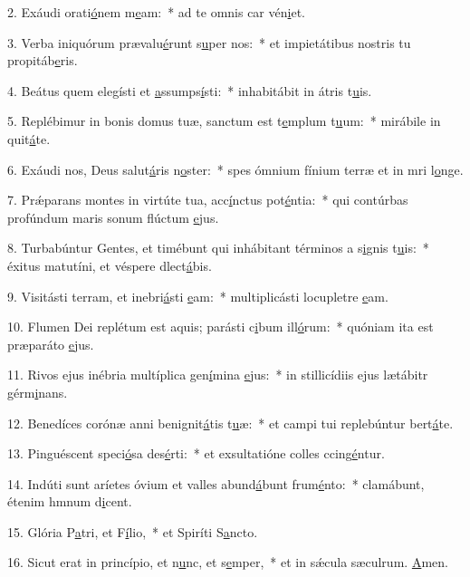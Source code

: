 2. Exáudi orati\uline{ó}nem m\uline{e}am:~* ad te omnis car vén\uline{i}et.\par 
3. Verba iniquórum prævalu\uline{é}runt s\uline{u}per nos:~* et impietátibus nostris tu propitáb\uline{e}ris.\par 
4. Beátus quem elegísti et \uline{a}ssumps\uline{í}sti:~* inhabitábit in átris t\uline{u}is.\par 
5. Replébimur in bonis domus tuæ, sanctum est t\uline{e}mplum t\uline{u}um:~* mirábile in quit\uline{á}te.\par 
6. Exáudi nos, Deus salut\uline{á}ris n\uline{o}ster:~* spes ómnium fínium terræ et in mri l\uline{o}nge.\par 
7. Prǽparans montes in virtúte tua, acc\uline{í}nctus pot\uline{é}ntia:~* qui contúrbas profúndum maris sonum flúctum \uline{e}jus.\par 
8. Turbabúntur Gentes, et timébunt qui inhábitant términos a s\uline{i}gnis t\uline{u}is:~* éxitus matutíni, et véspere dlect\uline{á}bis.\par 
9. Visitásti terram, et inebri\uline{á}sti \uline{e}am:~* multiplicásti locupletre \uline{e}am.\par 
10. Flumen Dei replétum est aquis; parásti c\uline{i}bum ill\uline{ó}rum:~* quóniam ita est præparáto \uline{e}jus.\par 
11. Rivos ejus inébria multíplica gen\uline{í}mina \uline{e}jus:~* in stillicídiis ejus lætábitr gérm\uline{i}nans.\par 
12. Benedíces corónæ anni benignit\uline{á}tis t\uline{u}æ:~* et campi tui replebúntur bert\uline{á}te.\par 
13. Pinguéscent speci\uline{ó}sa des\uline{é}rti:~* et exsultatióne colles ccing\uline{é}ntur.\par 
14. Indúti sunt aríetes óvium et valles abund\uline{á}bunt frum\uline{é}nto:~* clamábunt, étenim hmnum d\uline{i}cent.\par 
15. Glória P\uline{a}tri, et F\uline{í}lio,~* et Spiríti S\uline{a}ncto.\par 
16. Sicut erat in princípio, et n\uline{u}nc, et s\uline{e}mper,~* et in sǽcula sæculrum. \uline{A}men.\par 
